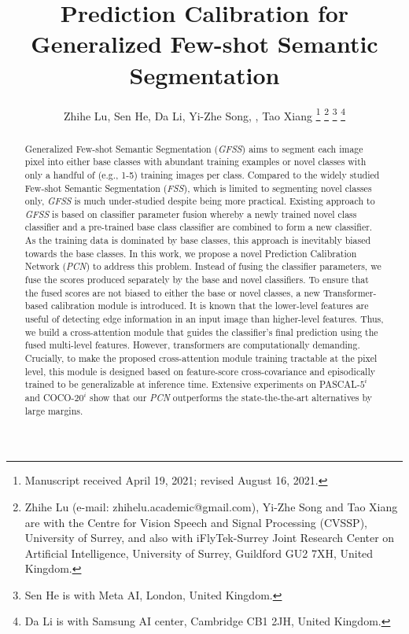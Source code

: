 \documentclass[journal]{IEEEtran}
\begin{document}
\title{Prediction Calibration for Generalized Few-shot Semantic Segmentation}

\author{Zhihe Lu, Sen He, Da Li, Yi-Zhe Song, , Tao Xiang
\thanks{Manuscript received April 19, 2021; revised August 16, 2021.}
\thanks{Zhihe Lu (e-mail: zhihelu.academic@gmail.com), Yi-Zhe Song and Tao Xiang are with the Centre for Vision Speech and Signal Processing (CVSSP), University of Surrey, and also with iFlyTek-Surrey Joint Research Center on Artificial Intelligence, University of Surrey, Guildford GU2 7XH, United Kingdom.}
\thanks{Sen He is with Meta AI, London, United Kingdom.}
\thanks{Da Li is with Samsung AI center, Cambridge CB1 2JH, United Kingdom.}
}




\maketitle

\begin{abstract}
 Generalized Few-shot Semantic Segmentation (\textit{GFSS}) aims to segment each image pixel into either base classes with abundant training examples or novel classes with only a handful of (e.g., 1-5) training images per class. Compared to the widely studied Few-shot Semantic Segmentation (\textit{FSS}), which is limited to segmenting novel classes only, \textit{GFSS} is much under-studied despite being more practical. Existing approach to \textit{GFSS} is based on classifier parameter fusion whereby a  newly trained novel class classifier and a pre-trained base class classifier are combined to form a new classifier. As the training data is dominated by base classes, this approach is inevitably biased towards the base classes. In this work, we propose a novel Prediction Calibration Network (\textit{PCN}) to address this problem. Instead of fusing the classifier parameters, we fuse the scores produced separately by the base and novel classifiers. To ensure that the fused scores are not biased to either the base or novel classes, a new Transformer-based calibration module is introduced. It is known that the lower-level features are useful of detecting edge information in an input image than higher-level features. Thus, we build a cross-attention module that guides the classifier's final prediction using the fused multi-level features. However, transformers are computationally demanding. 
 Crucially, to make the proposed cross-attention module training tractable at the pixel level, this module is designed based on feature-score cross-covariance and episodically trained to be generalizable at inference time. Extensive experiments on PASCAL-$5^{i}$ and COCO-$20^{i}$ show that our \textit{PCN} outperforms the state-the-the-art alternatives by large margins.
\end{abstract}
\end{document}
